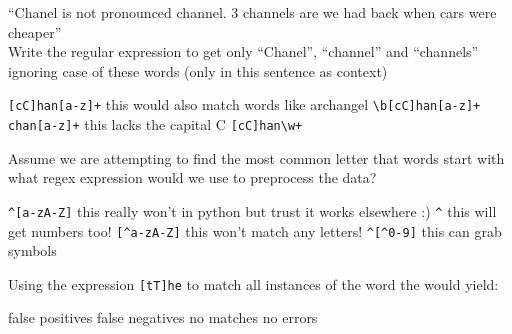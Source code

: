 \documentclass[theme=sleek, randomorder, hidesidemenu]{webquiz}
\begin{document}
\begin{question}
  ``Chanel is not pronounced channel. 3 channels are we had back when cars were cheaper''\\
  Write the regular expression to get only ``Chanel'', ``channel'' and ``channels'' ignoring case of these words (only in this sentence as context)

  \begin{choice}[columns=2]
    \incorrect \verb|[cC]han[a-z]+|
    \feedback this would also match words like archangel
    \correct \verb|\b[cC]han[a-z]+|
    \incorrect \verb|chan[a-z]+| \feedback this lacks the capital C
    \incorrect \verb|[cC]han\w+|

  \end{choice}


\end{question}
\begin{question}
  Assume we are attempting to find the most common letter that words start with what regex expression would we use to preprocess the data?
  \begin{choice}[columns=2]
    \correct \verb|^[a-zA-Z]| \feedback this really won't in python but trust it works elsewhere :)
    \incorrect \verb|^| \feedback this will get numbers too!
    \incorrect \verb|[^a-zA-Z]| \feedback this won't match any letters!
    \incorrect \verb|^[^0-9]| \incorrect this can grab symbols
  \end{choice}

\end{question}

\begin{question}
  Using the expression \verb|[tT]he| to match all instances of the word the would yield:
  \begin{choice}[columns=2]
    \correct false positives
    \incorrect false negatives
    \incorrect no matches
    \incorrect no errors

  \end{choice}

\end{question}
\end{document}
